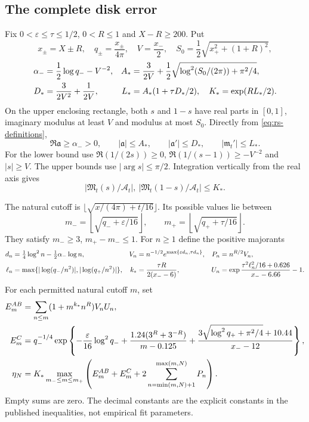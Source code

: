 \subsection{The complete disk error}

Fix $0<\varepsilon\le\tau\le1/2$, $0<R\le1$ and $X-R\ge200$.
Put
\[
 x_\pm=X\pm R,\quad q_\pm=\frac{x_\pm}{4\pi},\quad
 V=\frac{x_-}2,\quad S_0=\frac12\sqrt{x_+^2+(1+R)^2},
\]
\begin{align}
 \alpha_-&=\frac12\log q_- -V^{-2},&
 A_*&=\frac3{2V}+\frac12
           \sqrt{\log^2(S_0/(2\pi))+\pi^2/4},\notag\\
 D_*&=\frac3{2V^2}+\frac1{2V},&
 L_*&=A_*(1+\tau D_*/2),\quad K_*=\exp(RL_*/2).
 \label{eq:rs-disk-constants}
\end{align}
On the upper enclosing rectangle, both $s$ and $1-s$ have real parts
in $[0,1]$, imaginary modulus at least $V$ and modulus at most $S_0$.
Directly from \eqref{eq:rs-definitions},
\[
 \Re\mathfrak a\ge\alpha_->0,\qquad
 |\mathfrak a|\le A_*,\qquad |\mathfrak a'|\le D_*,
 \qquad |\mathfrak m_t'|\le L_*.
\]
For the lower bound use $\Re(1/(2s))\ge0$,
$\Re(1/(s-1))\ge-V^{-2}$ and $|s|\ge V$.
The upper bounds use $|\arg s|\le\pi/2$.
Integration vertically from the real axis gives
\begin{equation}\label{eq:rs-normalizer-cost}
 |\mathfrak M_t(s)/\mathcal A_t|,
 \ |\mathfrak M_t(1-s)/\mathcal A_t|\le K_*.
\end{equation}

The natural cutoff is $\lfloor\sqrt{x/(4\pi)+t/16}\rfloor$.
Its possible values lie between
\[
 m_-=\left\lfloor\sqrt{q_-+\varepsilon/16}\right\rfloor,\qquad
 m_+=\left\lfloor\sqrt{q_++\tau/16}\right\rfloor.
\]
They satisfy $m_-\ge3$, $m_+-m_-\le1$.
For $n\ge1$ define the positive majorants
\begin{align}
 d_n&=\tfrac14\log^2n-\tfrac12\alpha_-\log n,&
 V_n&=n^{-1/2}e^{\max\{\varepsilon d_n,\tau d_n\}},&
 P_n&=n^{R/2}V_n,\notag\\
 \ell_n&=\max\{|\log(q_-/n^2)|,|\log(q_+/n^2)|\},&
 k_*&=\frac{\tau R}{2(x_--6)},&
 U_n&=\exp\frac{\tau^2\ell_n^2/16+0.626}{x_--6.66}-1 .
 \label{eq:rs-majorants}
\end{align}
For each permitted natural cutoff $m$, set
\begin{align}
 E_m^{AB}&=\sum_{n\le m}(1+m^{k_*}n^R)V_nU_n,\notag\\
 E_m^C&=q_-^{-1/4}\exp\left\{-\frac{\varepsilon}{16}\log^2q_-
 +\frac{1.24(3^R+3^{-R})}{m-0.125}
 +\frac{3\sqrt{\log^2q_++\pi^2/4}+10.44}{x_--12}\right\},
 \notag\\
 \eta_N&=K_*\max_{m_-\le m\le m_+}
 \left(E_m^{AB}+E_m^C+
       2\sum_{n=\min(m,N)+1}^{\max(m,N)}P_n\right).
 \label{eq:rs-eta}
\end{align}
Empty sums are zero. The decimal constants are the explicit constants
in the published inequalities, not empirical fit parameters.

